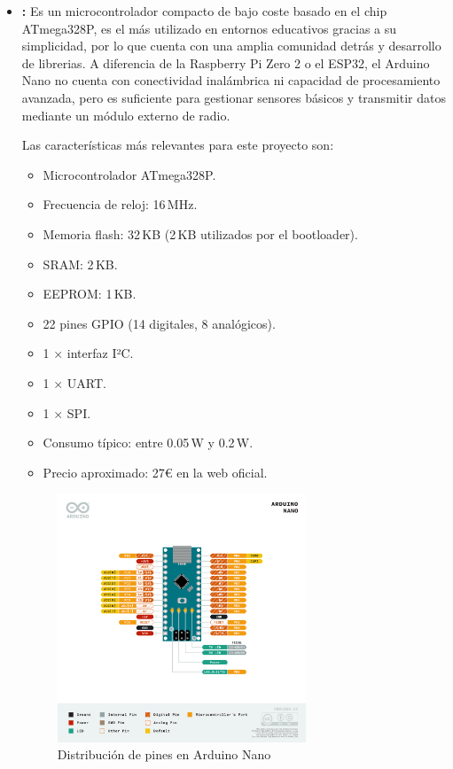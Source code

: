 \begin{itemize}
    \item \textbf{\cite{arduino_nano}:}
    Es un microcontrolador compacto de bajo coste basado en el chip ATmega328P, es el más utilizado en entornos educativos gracias a su simplicidad,
    por lo que cuenta con una amplia comunidad detrás y desarrollo de librerias.
    A diferencia de la Raspberry Pi Zero 2 o el ESP32, el Arduino Nano no cuenta con conectividad inalámbrica ni capacidad de procesamiento avanzada,
    pero es suficiente para gestionar sensores básicos y transmitir datos mediante un módulo externo de radio.

    Las características más relevantes para este proyecto son:
    \begin{itemize}
        \item Microcontrolador ATmega328P.
        \item Frecuencia de reloj: 16\,MHz.
        \item Memoria flash: 32\,KB (2\,KB utilizados por el bootloader).
        \item SRAM: 2\,KB.
        \item EEPROM: 1\,KB.
        \item 22 pines GPIO (14 digitales, 8 analógicos).
        \item 1 × interfaz I²C.
        \item 1 × UART.
        \item 1 × SPI.
        \item Consumo típico: entre 0.05\,W y 0.2\,W.
        \item Precio aproximado: 27€ en la web oficial.
    \end{itemize}

    \begin{figure}[H]
        \centering
        \includegraphics[width=0.7\textwidth]{Imagenes/Bitmap/arduinoNanogpio}
        \caption{Distribución de pines en Arduino Nano}
        \label{fig:arduino_nano_gpio}
    \end{figure}


\end{itemize}
